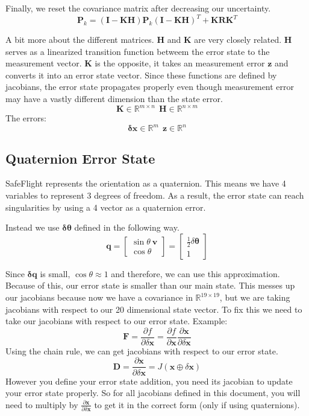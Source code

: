 \documentclass[11pt]{article}
\newcommand{\R}{\mathbb{R}}
\renewcommand{\vec}[1]{\mathbf{#1}}
\newcommand{\mat}[1]{\mathbf{#1}}
\begin{document}
Finally, we reset the covariance matrix after decreasing our uncertainty.
$$\mat{P}_k  = (\mat{I} -\mat{KH})\mat{P}_k(\mat{I}-\mat{KH})^T + \mat{KRK}^T$$

A bit more about the different matrices. $\mat{H}$ and $\mat{K}$ are very  closely related. $\mat{H}$ serves as a linearized transition function betweem the error state to the measurement vector. $\mat{K}$ is the opposite, it takes an measurement error $\vec{z}$ and converts it into an error state vector. Since these functions are defined by jacobians, the error state propagates properly even though measurement error may have a vastly different dimension than the  state error.
$$\mat{K} \in \R^{m\times n} ~~ \mat{H} \in \R^{n \times m}$$
The errors:
$$\vec{\delta x} \in \R^m ~~ \vec{z} \in \R^n$$
\subsection{Quaternion Error State}
SafeFlight represents the orientation as a quaternion. This means we have 4 variables to represent 3 degrees of freedom. As a result, the error state can reach singularities by using a 4 vector as a quaternion error.

Instead we use $\vec{\delta \theta}$ defined in the following way.
$$\vec{q} = \begin{bmatrix}
\sin \theta~ \vec{v}\\
\cos \theta
\end{bmatrix} = \begin{bmatrix}
\frac{1}{2}\delta \vec{\theta}\\
1
\end{bmatrix}$$

Since $\vec{\delta q}$ is small, $\cos\theta \approx 1$ and therefore, we can use this approximation. Because of this, our error state is smaller than our main state. This messes up our jacobians because now we have a covariance in $\R^{19\times 19}$, but we are taking jacobians with respect to our 20 dimensional state vector. To fix this we need to take our jacobians with respect to our error state. Example:
$$\mat{F} = \frac{\partial f}{\partial \delta \vec{x}} = \frac{\partial f}{\partial \vec{x}}\frac{\partial \vec{x}}{\partial \delta \vec{x}}$$
Using the chain rule, we can get jacobians with respect to our error state.
$$\mat{D} = \frac{\partial \vec{x}}{\partial \delta \vec{x}} = J(\vec{x} \oplus \delta \vec{x})$$
However you define your error state addition, you need its jacobian to update your error state properly. So for all jacobians defined in this document, you will need to multiply by $\frac{\partial \vec{x}}{\partial \delta \vec{x}}$ to get it in the correct form (only if using quaternions).
\end{document}
